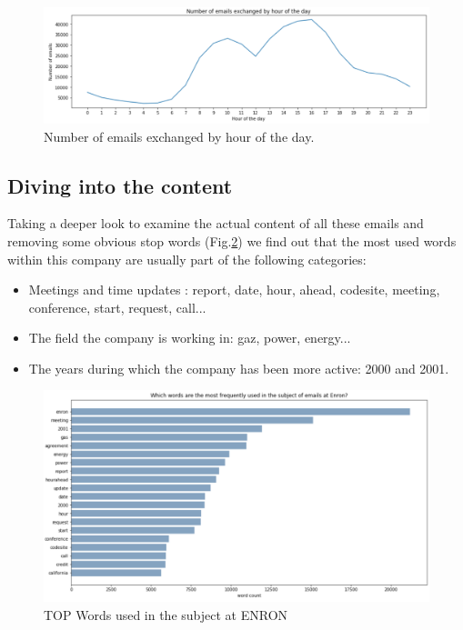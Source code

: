 \documentclass[11pt]{article}
\begin{document}
\begin{figure}[htbp]
  \centering
  \includegraphics[width=\columnwidth]{images/emails_hour.png}
  \vspace{-7mm}
  \caption{Number of emails exchanged by hour of the day.}
  \vspace{-3mm}
  \label{fig:emails_hour}
\end{figure}


\subsection{Diving into the content}
Taking a deeper look to examine the actual content of all these emails and removing some obvious stop words (Fig.\ref{fig:subject_content}) we find out that the most used words within this company are usually part of the following categories:
\vspace{-3mm}
\begin{itemize}
\item Meetings and time updates : report, date, hour, ahead, codesite, meeting, conference, start, request, call...
\vspace{-3mm}
\item The field the company is working in: gaz, power, energy...
\vspace{-3mm}
\item The years during which the company has been more active: 2000 and 2001.
\end{itemize}

\vspace{-3mm}
\begin{figure}[htbp]
  \centering
  \includegraphics[width=\columnwidth]{images/subject_content.png}
  \vspace{-7mm}
  \caption{TOP Words used in the subject at ENRON}
  \vspace{-3mm}
  \label{fig:subject_content}
\end{figure}
\end{document}

